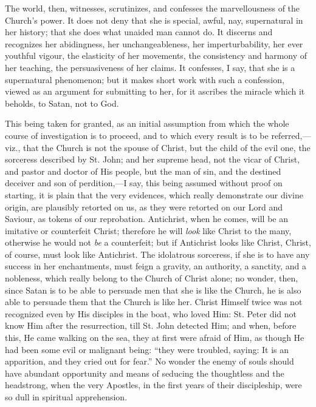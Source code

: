 The world, then, witnesses, scrutinizes, and confesses
the marvellousness of the Church's power. It does not
deny that she is special, awful, nay, supernatural in her
history; that she does what unaided man cannot do. It
discerns and recognizes her abidingness, her
unchangeableness, her imperturbability, her ever youthful
vigour, the elasticity of her movements, the consistency
and harmony of her teaching, the persuasiveness of her
claims. It confesses, I say, that she is a supernatural
phenomenon; but it makes short work with such a
confession, viewed as an argument for submitting to her,
for it ascribes the miracle which it beholds, to Satan,
not to God.

This being taken for granted, as an initial assumption
from which the whole course of investigation is to
proceed, and to which every result is to be
referred,—viz., that the Church is not the spouse of
Christ, but the child of the evil one, the sorceress
described by St. John; and her supreme head, not the
vicar of Christ, and pastor and doctor of His people, but
the man of sin, and the destined deceiver and son of
perdition,—I say, this being assumed without
proof on starting, it is plain that the very evidences,
which really demonstrate our divine origin, are plausibly
retorted on us, as they were retorted on our Lord and
Saviour, as tokens of our reprobation. Antichrist, when
he comes, will be an imitative or counterfeit Christ;
therefore he will \emph{look} like Christ to the many,
otherwise he would not \emph{be} a counterfeit; but if
Antichrist looks like Christ, Christ, of course, must
look like Antichrist. The idolatrous sorceress, if she is
to have any success in her enchantments, must feign a gravity, an authority, a sanctity, and a nobleness, which
really belong to the Church of Christ alone; no wonder,
then, since Satan is to be able to persuade men that she
is like the Church, he is also able to persuade them that
the Church is like her. Christ Himself twice was not
recognized even by His disciples in the boat, who loved
Him: St. Peter did not know Him after the resurrection,
till St. John detected Him; and when, before this, He
came walking on the sea, they at first were afraid of
Him, as though He had been some evil or malignant being:
``they were troubled, saying: It is an apparition,
and they cried out for fear.'' No wonder the enemy of
souls should have abundant opportunity and means of
seducing the thoughtless and the headstrong, when the
very Apostles, in the first years of their discipleship,
were so dull in spiritual apprehension.

